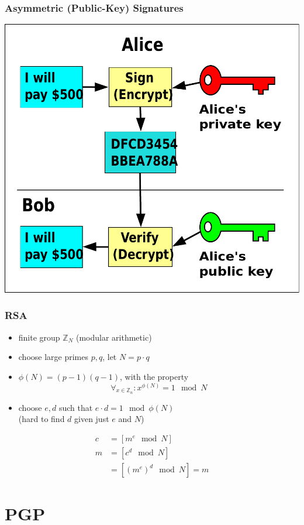 \documentclass{beamer}
\begin{document}
\begin{frame}
  \frametitle{Asymmetric (Public-Key) Signatures}

\includegraphics[height=0.5\textheight]{Public_key_signing}

\end{frame}

\begin{frame}
  \frametitle{RSA}

  \begin{itemize}
    \item finite group $\mathbb{Z}_N$ (modular arithmetic)
    \item choose large primes $p, q$, let $N = p \cdot q$
    \item $\phi(N) = (p - 1)(q - 1)$, with the property $$\forall_{x\in\mathbb{Z}_n}: x^{\phi(N)} = 1 \mod N$$
    \item choose $e, d$ such that $e \cdot d = 1 \mod \phi(N)$\\
    (hard to find $d$ given just $e$ and $N$)
  \end{itemize}
  \begin{align*}
  c &= [m^e \mod N]\\
  m &= [c^d \mod N]\\
    &= [(m^e)^d \mod N] = m
  \end{align*}
\end{frame}

\section{PGP}
\end{document}
